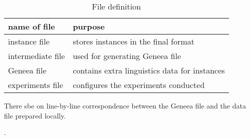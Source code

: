 \begin{table}[h]

\centering
\begin{tabular}{ll}
\toprule
\textbf{name of file}& \textbf{purpose} \\
\midrule
instance file		 & stores instances in the final format \\
intermediate file	 & used for generating Geneea file \\
Geneea file			 & contains extra linguistics data for instances \\
experiments file	 & configures the experiments conducted \\
\bottomrule
\end{tabular}

\caption{File definition}\label{tab:files}
\end{table}
There sbe on line-by-line correspondence between the Geneea file and the data file prepared locally.

.  

